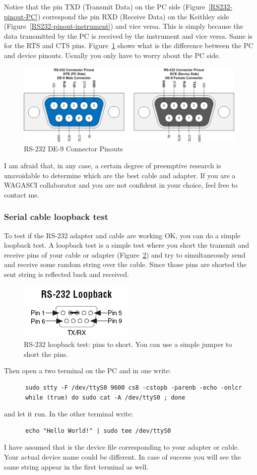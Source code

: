Notice that the pin TXD (Transmit Data) on the PC side
(Figure~\ref{RS232-pinout-PC}) correspond the pin RXD (Receive Data) on the
Keithley side (Figure~\ref{RS232-pinout-instrument}) and vice versa. This is
simply because the data transmitted by the PC is received by the instrument and
vice versa. Same is for the RTS and CTS pins.
Figure~\ref{RS-232_DE-9_Connector_Pinouts} shows what is the difference between
the PC and device pinouts. Usually you only have to worry about the PC side.
\begin{figure}[H]
  \centering \includegraphics[width=0.9\linewidth]{RS-232_DE-9_Connector_Pinouts}
  \caption{RS-232 DE-9 Connector Pinouts}\label{RS-232_DE-9_Connector_Pinouts}
\end{figure}
I am afraid that, in any case, a certain degree of preemptive research is
unavoidable to determine which are the best cable and adapter. If you are a
WAGASCI collaborator and you are not confident in your choice, feel free to
contact me.
\subsubsection{Serial cable loopback test}
To test if the RS-232 adapter and cable are working OK, you can do a simple
loopback test. A loopback test is a simple test where you short the transmit and
receive pins of your cable or adapter (Figure~\ref{RS-232_loopback}) and try to
simultaneously send and receive some random string over the cable. Since those
pins are shorted the sent string is reflected back and received.
\begin{figure}[H]
  \centering \includegraphics[width=0.4\linewidth]{RS-232_loopback}
  \caption{RS-232 loopback test: pins to short. You can use a simple
    jumper to short the pins.}\label{RS-232_loopback}
\end{figure}
Then open a two terminal on the PC and in one write:
\begin{lstlisting}
      sudo stty -F /dev/ttyS0 9600 cs8 -cstopb -parenb -echo -onlcr
      while (true) do sudo cat -A /dev/ttyS0 ; done
\end{lstlisting}
  and let it run. In the other terminal write:
\begin{lstlisting}
      echo "Hello World!" | sudo tee /dev/ttyS0
\end{lstlisting}
I have assumed that  is the device file corresponding to
your adapter or cable. Your actual device name could be different. In case of
success you will see the same string appear in the first terminal as well.

